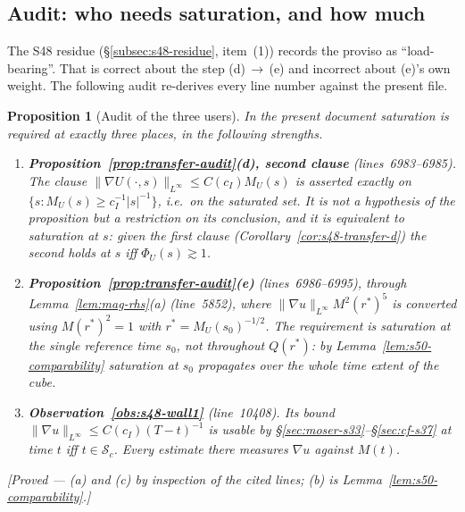\documentclass[11pt]{article}
\newtheorem{proposition}[theorem]{Proposition}
\theoremstyle{definition}
\theoremstyle{remark}
\begin{document}
\subsection{Audit: who needs saturation, and how much}
\label{subsec:s50-audit}

The S48 residue (§\ref{subsec:s48-residue}, item~(1)) records the proviso as
``load-bearing''. That is correct about the step
(d)$\,\to\,$(e) and incorrect about (e)'s own weight. The following audit
re-derives every line number against the present file.

\begin{proposition}[Audit of the three users]\label{prop:s50-audit}
  In the present document saturation is required at exactly three places, in
  the following strengths.
  \begin{enumerate}[label=\textup{(\alph*)},leftmargin=2.4em]
  \item \textbf{Proposition~\ref{prop:transfer-audit}(d), second clause}
    (lines~6983--6985). The clause
    $\|\nabla U(\cdot,s)\|_{L^\infty}\leq C(c_I)M_U(s)$ is asserted exactly on
    $\{s : M_U(s)\geq c_I^{-1}|s|^{-1}\}$, i.e.\ on the saturated set. It is
    not a hypothesis of the proposition but a restriction on its conclusion,
    and it is \emph{equivalent} to saturation at $s$: given the first clause
    (Corollary~\ref{cor:s48-transfer-d}) the second holds at $s$ iff
    $\Phi_U(s)\gtrsim1$.
  \item \textbf{Proposition~\ref{prop:transfer-audit}(e)} (lines~6986--6995),
    through Lemma~\ref{lem:mag-rhs}(a) (line~5852), where
    $\|\nabla u\|_{L^\infty}M^2(r^*)^5$ is converted using $M(r^*)^2=1$ with
    $r^*=M_U(s_0)^{-1/2}$. The requirement is saturation \emph{at the single
    reference time $s_0$}, not throughout $Q(r^*)$: by
    Lemma~\ref{lem:s50-comparability} saturation at $s_0$ propagates over the
    whole time extent of the cube.
  \item \textbf{Observation~\ref{obs:s48-wall1}} (line~10408). Its bound
    $\|\nabla u\|_{L^\infty}\leq C(c_I)(T-t)^{-1}$ is usable by
    §\ref{sec:moser-s33}--§\ref{sec:cf-s37} at time $t$ iff $t\in\mathcal{S}_c$.
    Every estimate there measures $\nabla u$ against $M(t)$.
  \end{enumerate}
  \emph{[Proved --- (a) and (c) by inspection of the cited lines; (b) is
  Lemma~\ref{lem:s50-comparability}.]}
\end{proposition}
\end{document}
